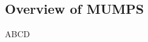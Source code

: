 \subsection{Overview of MUMPS}

\begin{frame}[t]{ABCD}
    \small
    \justifying
    \space
\end{frame}